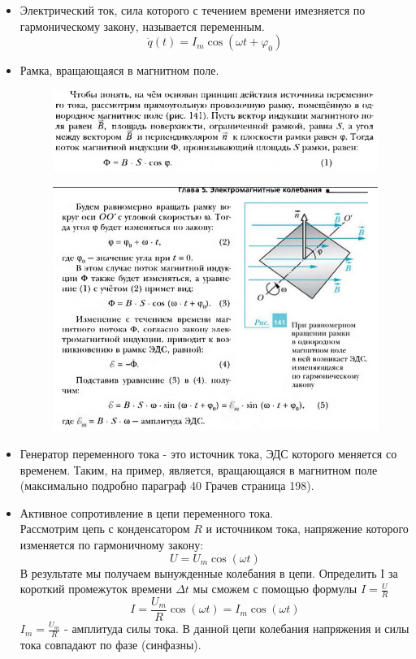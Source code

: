 \documentclass{article}
\begin{document}
\begin{flushleft}
\begin{itemize}
        \item Электрический ток, сила которого с течением времени имезняется по гармоническому закону, называется переменным. \[\dot q(t) = I_m \cos(\omega t + \varphi_0)\]
        \item Рамка, вращающаяся в магнитном поле.
        \begin{figure}[H]
            \centering
            \includegraphics[width=0.8\linewidth]{images/Screenshot_3.png}
            \label{fig:enter-label}
        \end{figure}
        \begin{figure}[H]
            \centering
            \includegraphics[width=0.8\linewidth]{images/Screenshot_4.png}
            \label{fig:enter-label}
        \end{figure}
        \item Генератор переменного тока - это источник тока, ЭДС которого меняется со временем. Таким, на пример, является, вращающаяся в магнитном поле (максимально подробно параграф 40 Грачев страница 198).
        \item Активное сопротивление в цепи переменного тока. \\ Рассмотрим цепь с конденсатором $R$ и источником тока, напряжение которого изменяется по гармоничному закону: \[U = U_m \cos(\omega t)\]
        В результате мы получаем вынужденные колебания в цепи. Определить I за короткий промежуток времени $\Delta t$ мы сможем с помощью формулы $I = \frac{U}{R}$ \[I = \frac{U_m}{R} \cos(\omega t) = I_m\cos(\omega t)\] $I_m = \frac{U_m}{R}$ - амплитуда силы тока. В данной цепи колебания напряжения и силы тока совпадают по фазе (синфазны).

\end{itemize}
\end{flushleft}
\end{document}

